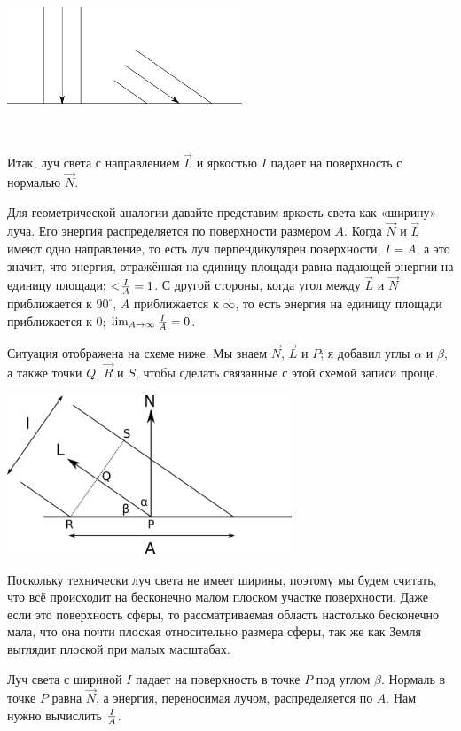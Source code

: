 \includegraphics[width=7cm, height=4.8cm]{light_vectors1.png}

Итак, луч света с направлением $\vec{L}$ и яркостью $I$ падает на поверхность с нормалью $\vec{N}$.

Для геометрической аналогии давайте представим яркость света как «ширину» луча. Его энергия распределяется по поверхности размером $A$. Когда $\vec{N}$ и $\vec{L}$ имеют одно направление, то есть луч перпендикулярен поверхности, $I = A$, а это значит, что энергия, отражённая на единицу площади равна падающей энергии на единицу площади; <${I \over A} = 1$. С другой стороны, когда угол между $\vec{L}$ и $\vec{N}$ приближается к $90^\circ$, $A$ приближается к $\infty$, то есть энергия на единицу площади приближается к 0; $\lim_{A \to \infty} {I \over A} = 0$.

Ситуация отображена на схеме ниже. Мы знаем $\vec{N}$, $\vec{L}$ и $P$; я добавил углы $\alpha$ и $\beta$, а также точки $Q$, $\vec{R}$ и $S$, чтобы сделать связанные с этой схемой записи проще.

\includegraphics[width=8.5cm, height=4.8cm]{light_vectors2.png}

Поскольку технически луч света не имеет ширины, поэтому мы будем считать, что всё происходит на бесконечно малом плоском участке поверхности. Даже если это поверхность сферы, то рассматриваемая область настолько бесконечно мала, что она почти плоская относительно размера сферы, так же как Земля выглядит плоской при малых масштабах.

Луч света с шириной $I$ падает на поверхность в точке $P$ под углом $\beta$. Нормаль в точке $P$ равна $\vec{N}$, а энергия, переносимая лучом, распределяется по $A$. Нам нужно вычислить ${I \over A}$.

